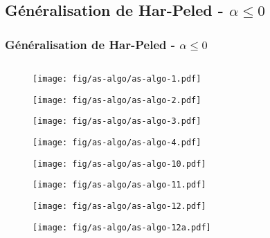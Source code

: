 \documentclass{beamer}
\begin{document}
\subsection{Généralisation de Har-Peled - $\alpha \leq 0$}
\begin{frame}
\frametitle{Généralisation de Har-Peled - $\alpha \leq 0$}
  
  \begin{columns}[t]
  \begin{column}{7cm}
      {
        \begin{figure}[h!]
          \centering
          \texttt{[image: fig/as-algo/as-algo-1.pdf]}
      \end{figure}
      }
      {
        \begin{figure}[h!]
          \centering
          \texttt{[image: fig/as-algo/as-algo-2.pdf]}
      \end{figure}
      }
      {
        \begin{figure}[h!]
          \centering
          \texttt{[image: fig/as-algo/as-algo-3.pdf]}
      \end{figure}
      }
      {
        \begin{figure}[h!]
          \centering
          \texttt{[image: fig/as-algo/as-algo-4.pdf]}
      \end{figure}
      }
      {
        \begin{figure}[h!]
          \centering
          \texttt{[image: fig/as-algo/as-algo-10.pdf]}
      \end{figure}
      }
      {
        \begin{figure}[h!]
          \centering
          \texttt{[image: fig/as-algo/as-algo-11.pdf]}
      \end{figure}
      }
      {
        \begin{figure}[h!]
          \centering
          \texttt{[image: fig/as-algo/as-algo-12.pdf]}
      \end{figure}
      }
      {
        \begin{figure}[h!]
          \centering
          \texttt{[image: fig/as-algo/as-algo-12a.pdf]}

\end{figure}}
\end{column}
\end{columns}
\end{frame}
\end{document}
